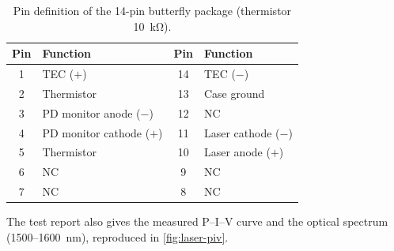 \begin{table}[H]
	\centering
	\begin{tabular}{@{}cl@{\qquad}cl@{}}
		\toprule
		\textbf{Pin} & \textbf{Function} & \textbf{Pin} & \textbf{Function} \\
		\midrule
		1 & TEC ($+$)                  & 14 & TEC ($-$) \\
		2 & Thermistor                 & 13 & Case ground \\
		3 & PD monitor anode ($-$)     & 12 & NC \\
		4 & PD monitor cathode ($+$)   & 11 & Laser cathode ($-$) \\
		5 & Thermistor                 & 10 & Laser anode ($+$) \\
		6 & NC                         &  9 & NC \\
		7 & NC                         &  8 & NC \\
		\bottomrule
	\end{tabular}
	\caption{Pin definition of the 14-pin butterfly package (thermistor \SI{10}{\kilo\ohm}).}
	\label{tab:laser-pins}
\end{table}

The test report also gives the measured P--I--V curve and the optical spectrum (\SI{1500}{}--\SI{1600}{\nano\metre}), reproduced in \autoref{fig:laser-piv}. 


